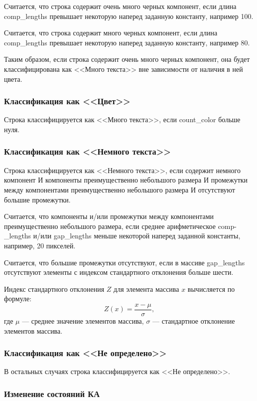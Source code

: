 Считается, что строка содержит очень много черных компонент, если длина comp\_lengths превышает некоторую наперед заданную константу, например 100.

Считается, что строка содержит много черных компонент, если длина comp\_lengths превышает некоторую наперед заданную константу, например 80.

Таким образом, если строка содержит очень много черных компонент, она будет классифицирована как <<Много текста>> вне зависимости от наличия в ней цвета.

\subsubsection*{Классификация как <<Цвет>>}

Строка классифицируется как <<Много текста>>, если count\_color больше нуля.

\subsubsection*{Классификация как <<Немного текста>>}

Строка классифицируется как <<Немного текста>>, если содержит немного компонент И компоненты преимущественно небольшого размера И промежутки между компонентами преимущественно небольшого размера И отсутствуют большие промежутки.

Считается, что компоненты и/или промежутки между компонентами преимущественно небольшого размера, если среднее арифметическое comp-\_lengths и/или gap\_lengths меньше некоторой наперед заданной константы, например, 20 пикселей.

Считается, что большие промежутки отсутствуют, если в массиве gap\_lengths отсутствуют элементы с индексом стандартного отклонения больше шести.

Индекс стандартного отклонения $Z$ для элемента массива $x$ вычисляется по формуле:
$$
Z(x) = \frac{x - \mu}{\sigma},
$$
где $\mu$ --- среднее значение элементов массива, $\sigma$ --- стандартное отклонение элементов массива.

\subsubsection*{Классификация как <<Не определено>>}

В остальных случаях строка классифицируется как <<Не определено>>.

\subsubsection*{Изменение состояний КА}

